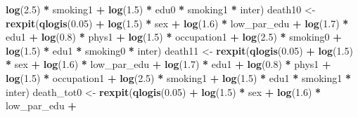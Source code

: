 \documentclass[
]{book}
\newenvironment{Shaded}{\begin{snugshade}}{\end{snugshade}}
\newcommand{\FloatTok}[1]{\textcolor[rgb]{0.00,0.00,0.81}{#1}}
\newcommand{\FunctionTok}[1]{\textcolor[rgb]{0.13,0.29,0.53}{\textbf{#1}}}
\newcommand{\NormalTok}[1]{#1}
\newcommand{\OtherTok}[1]{\textcolor[rgb]{0.56,0.35,0.01}{#1}}
\newcommand{\SpecialCharTok}[1]{\textcolor[rgb]{0.81,0.36,0.00}{\textbf{#1}}}
\begin{document}
\begin{Shaded}
\begin{Highlighting}[]
                      \FunctionTok{log}\NormalTok{(}\FloatTok{2.5}\NormalTok{) }\SpecialCharTok{*}\NormalTok{ smoking1 }\SpecialCharTok{+} \FunctionTok{log}\NormalTok{(}\FloatTok{1.5}\NormalTok{) }\SpecialCharTok{*}\NormalTok{ edu0 }\SpecialCharTok{*}\NormalTok{ smoking1 }\SpecialCharTok{*}\NormalTok{ inter)}
\NormalTok{  death10 }\OtherTok{\textless{}{-}} \FunctionTok{rexpit}\NormalTok{(}\FunctionTok{qlogis}\NormalTok{(}\FloatTok{0.05}\NormalTok{) }\SpecialCharTok{+} \FunctionTok{log}\NormalTok{(}\FloatTok{1.5}\NormalTok{) }\SpecialCharTok{*}\NormalTok{ sex  }\SpecialCharTok{+} \FunctionTok{log}\NormalTok{(}\FloatTok{1.6}\NormalTok{) }\SpecialCharTok{*}\NormalTok{ low\_par\_edu }\SpecialCharTok{+} 
                      \FunctionTok{log}\NormalTok{(}\FloatTok{1.7}\NormalTok{) }\SpecialCharTok{*}\NormalTok{ edu1 }\SpecialCharTok{+} \FunctionTok{log}\NormalTok{(}\FloatTok{0.8}\NormalTok{) }\SpecialCharTok{*}\NormalTok{ phys1 }\SpecialCharTok{+} \FunctionTok{log}\NormalTok{(}\FloatTok{1.5}\NormalTok{) }\SpecialCharTok{*}\NormalTok{ occupation1 }\SpecialCharTok{+} 
                      \FunctionTok{log}\NormalTok{(}\FloatTok{2.5}\NormalTok{) }\SpecialCharTok{*}\NormalTok{ smoking0 }\SpecialCharTok{+} \FunctionTok{log}\NormalTok{(}\FloatTok{1.5}\NormalTok{) }\SpecialCharTok{*}\NormalTok{ edu1 }\SpecialCharTok{*}\NormalTok{ smoking0 }\SpecialCharTok{*}\NormalTok{ inter)}
\NormalTok{  death11 }\OtherTok{\textless{}{-}} \FunctionTok{rexpit}\NormalTok{(}\FunctionTok{qlogis}\NormalTok{(}\FloatTok{0.05}\NormalTok{) }\SpecialCharTok{+} \FunctionTok{log}\NormalTok{(}\FloatTok{1.5}\NormalTok{) }\SpecialCharTok{*}\NormalTok{ sex  }\SpecialCharTok{+} \FunctionTok{log}\NormalTok{(}\FloatTok{1.6}\NormalTok{) }\SpecialCharTok{*}\NormalTok{ low\_par\_edu }\SpecialCharTok{+} 
                      \FunctionTok{log}\NormalTok{(}\FloatTok{1.7}\NormalTok{) }\SpecialCharTok{*}\NormalTok{ edu1 }\SpecialCharTok{+} \FunctionTok{log}\NormalTok{(}\FloatTok{0.8}\NormalTok{) }\SpecialCharTok{*}\NormalTok{ phys1 }\SpecialCharTok{+} \FunctionTok{log}\NormalTok{(}\FloatTok{1.5}\NormalTok{) }\SpecialCharTok{*}\NormalTok{ occupation1 }\SpecialCharTok{+} 
                      \FunctionTok{log}\NormalTok{(}\FloatTok{2.5}\NormalTok{) }\SpecialCharTok{*}\NormalTok{ smoking1 }\SpecialCharTok{+} \FunctionTok{log}\NormalTok{(}\FloatTok{1.5}\NormalTok{) }\SpecialCharTok{*}\NormalTok{ edu1 }\SpecialCharTok{*}\NormalTok{ smoking1 }\SpecialCharTok{*}\NormalTok{ inter)}
\NormalTok{  death\_tot0 }\OtherTok{\textless{}{-}} \FunctionTok{rexpit}\NormalTok{(}\FunctionTok{qlogis}\NormalTok{(}\FloatTok{0.05}\NormalTok{) }\SpecialCharTok{+} \FunctionTok{log}\NormalTok{(}\FloatTok{1.5}\NormalTok{) }\SpecialCharTok{*}\NormalTok{ sex  }\SpecialCharTok{+} \FunctionTok{log}\NormalTok{(}\FloatTok{1.6}\NormalTok{) }\SpecialCharTok{*}\NormalTok{ low\_par\_edu }\SpecialCharTok{+} 

\end{Highlighting}
\end{Shaded}
\end{document}

